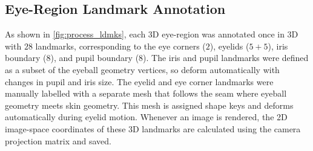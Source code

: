 \subsection{Eye-Region Landmark Annotation}

As shown in \autoref{fig:process_ldmks}, each 3D eye-region was annotated once in 3D with $28$ landmarks, corresponding to the eye corners ($2$), eyelids ($5\!+\!5$), iris boundary ($8$), and pupil boundary ($8$).
The iris and pupil landmarks were defined as a subset of the eyeball geometry vertices, so deform automatically with changes in pupil and iris size.
The eyelid and eye corner landmarks were manually labelled with a separate mesh that follows the seam where eyeball geometry meets skin geometry.
This mesh is assigned shape keys and deforms automatically during eyelid motion.
%
Whenever an image is rendered, the 2D image-space coordinates of these 3D landmarks are calculated using the camera projection matrix and saved.